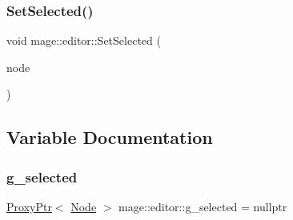 \hypertarget{namespacemage_1_1editor_a1c7e3052c446f3acbe8a1bb2106aec7a}{}\label{namespacemage_1_1editor_a1c7e3052c446f3acbe8a1bb2106aec7a} 
\subsubsection{\texorpdfstring{Set\+Selected()}{SetSelected()}}
{\footnotesize\ttfamily void mage\+::editor\+::\+Set\+Selected (\begin{DoxyParamCaption}\item[{\hyperlink{classmage_1_1_proxy_ptr}{Proxy\+Ptr}$<$ \hyperlink{classmage_1_1_node}{Node} $>$}]{node }\end{DoxyParamCaption})\hspace{0.3cm}{\ttfamily [noexcept]}}



\subsection{Variable Documentation}
\hypertarget{namespacemage_1_1editor_a07eeeb446dc1d39e1d6ffa06a6324570}{}\label{namespacemage_1_1editor_a07eeeb446dc1d39e1d6ffa06a6324570} 
\subsubsection{\texorpdfstring{g\+\_\+selected}{g\_selected}}
{\footnotesize\ttfamily \hyperlink{classmage_1_1_proxy_ptr}{Proxy\+Ptr}$<$ \hyperlink{classmage_1_1_node}{Node} $>$ mage\+::editor\+::g\+\_\+selected = nullptr\hspace{0.3cm}{\ttfamily [static]}}

